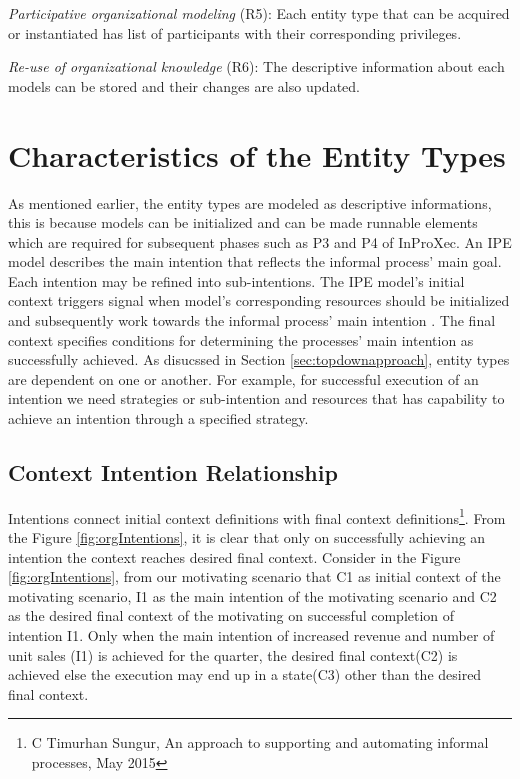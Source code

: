 \textit{Participative organizational modeling} (R5): Each entity type that can be acquired or instantiated has list of participants with their corresponding privileges. 

\textit{Re-use of organizational knowledge} (R6): The descriptive information about each models can be stored and their changes are also updated. 
 
\section{Characteristics of the Entity Types}
\label{sec:enttyperelation}
As mentioned earlier, the entity types are modeled as descriptive informations, this is because models can be initialized and can be made runnable elements which are required for subsequent phases such as P3 and P4 of InProXec. An IPE model describes the main intention that reflects the informal process' main goal. Each intention may be refined into sub-intentions. The IPE model's initial context triggers signal when model's corresponding resources should be initialized and subsequently work towards the informal process' main intention \cite{Sungur2015a}. The final context specifies conditions for determining the processes' main intention as successfully achieved. As disucssed in Section \ref{sec:topdownapproach}, entity types are dependent on one or another. For example, for successful execution of an intention we need strategies or sub-intention and resources that has capability to achieve an intention through a specified strategy. 

\subsection{Context Intention Relationship}
\label{sec:ctxintrel}
Intentions connect initial context definitions with final context definitions\footnote{C Timurhan Sungur, An approach to supporting and automating informal processes, May 2015}. From the Figure \ref{fig:orgIntentions}, it is clear that only on successfully achieving an intention the context reaches desired final context. Consider in the Figure \ref{fig:orgIntentions}, from our motivating scenario that C1 as initial context of the motivating scenario, I1 as the main intention of the motivating scenario and C2 as the desired final context of the motivating on successful completion of intention I1. Only when the main intention of increased revenue and number of unit sales (I1) is achieved for the quarter, the desired final context(C2) is achieved else the execution may end up in a state(C3) other than the desired final context. 


